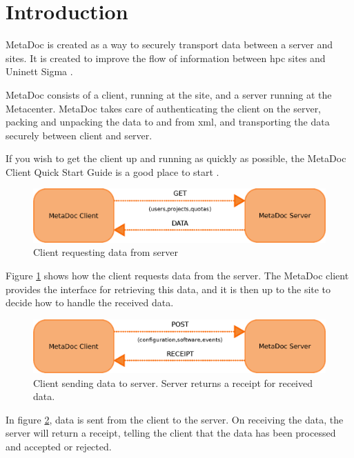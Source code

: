 \newpage
\section{Introduction}
MetaDoc is created as a way to securely transport data between a server and 
sites. It is created to improve the flow of information between \gls{hpc} sites
and Uninett Sigma \cite{improvingflow}.

MetaDoc consists of a client, running at the site, and a server running at the
Metacenter. MetaDoc takes care of authenticating the client on the server,
packing and unpacking the data to and from \gls{xml}, and transporting the data
securely between client and server. 

If you wish to get the client up and running as quickly as possible, the
MetaDoc Client Quick Start Guide is a good place to start
\cite{quick_start_guide}.

\begin{figure}[h!]
    \includegraphics[width=\textwidth]{img/get_data}
    \caption{Client requesting data from server}
    \label{fig:get_data}
\end{figure}

Figure \ref{fig:get_data} shows how the client requests data from the server.
The MetaDoc client provides the interface for retrieving this data, and it is
then up to the site to decide how to handle the received data. 

\begin{figure}[h!]
    \includegraphics[width=\textwidth]{img/post_data}
    \caption{Client sending data to server. Server returns a receipt for
    received data.}
    \label{fig:post_data}
\end{figure}

In figure \ref{fig:post_data}, data is sent from the client to the server. On
receiving the data, the server will return a receipt, telling the client that
the data has been processed and accepted or rejected. 

